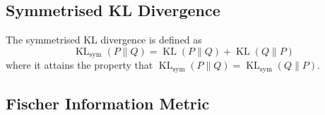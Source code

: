 \documentclass[11pt]{report} %
\begin{document}
\subsection{Symmetrised KL Divergence}

The symmetrised KL divergence is defined as
\begin{equation}
\operatorname{KL}_{\mathrm{sym}}\left(P\middle\|Q\right) = \operatorname{KL}\left(P\middle\|Q\right) + \operatorname{KL}\left(Q\middle\|P\right)
\end{equation}
where it attains the property that $\operatorname{KL}_{\mathrm{sym}}\left(P\middle\|Q\right) = \operatorname{KL}_{\mathrm{sym}}\left(Q\middle\|P\right)$.

\subsection{Fischer Information Metric}
\end{document}

